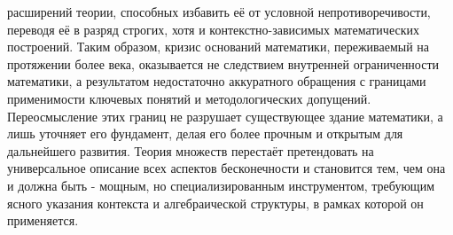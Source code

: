 \documentclass[12pt]{article}
\begin{document}
расширений теории, способных избавить её от условной непротиворечивости, переводя её в разряд строгих, хотя и контекстно-зависимых математических построений. Таким образом, кризис оснований математики, переживаемый на протяжении более века, оказывается не следствием внутренней ограниченности математики, а результатом недостаточно аккуратного обращения с границами применимости ключевых понятий и методологических допущений. Переосмысление этих границ не разрушает существующее здание математики, а лишь уточняет его фундамент, делая его более прочным и открытым для дальнейшего развития. Теория множеств перестаёт претендовать на универсальное описание всех аспектов бесконечности и становится тем, чем она и должна быть - мощным, но специализированным инструментом, требующим ясного указания контекста и алгебраической структуры, в рамках которой он применяется.

\printbibliography

 
\end{document}
